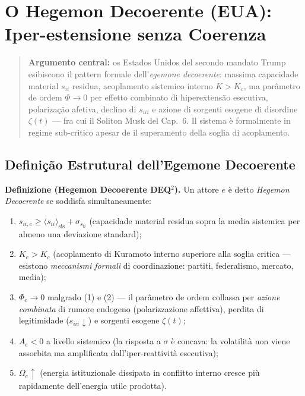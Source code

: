 \chapter{O Hegemon Decoerente (EUA): Iper-estensione senza
Coerenza}\label{legemone-decoerente-usa-hiperextensão-senza-coerenza}

\begin{quote}
\textbf{Argumento central:} os Estados Unidos del secondo mandato Trump
esibiscono il pattern formale dell'\emph{egemone decoerente}: massima
capacidade material \(s_{ii}\) residua, acoplamento sistemico interno
\(K > K_c\), ma parâmetro de ordem \(\Phi \to 0\) per effetto combinato
di hiperextensão esecutiva, polarização afetiva, declino di
\(s_{iii}\) e azione di sorgenti esogene di disordine \(\zeta(t)\) ---
fra cui il Soliton Musk del Cap.~6. Il sistema è formalmente in regime
sub-critico apesar de il superamento della soglia di acoplamento.
\end{quote}



\section{Definição Estrutural dell'Egemone
Decoerente}\label{definição-estrutural-dellegemone-decoerente}

\Hypoth{} \textbf{Definizione (Hegemon Decoerente DEQ$^2$).} Un attore
\(e\) è detto \emph{Hegemon Decoerente} se soddisfa simultaneamente:

\begin{enumerate}
\def\labelenumi{\arabic{enumi}.}
\tightlist
\item
  \(s_{ii,e} \geq \langle s_{ii} \rangle_{\text{sis}} + \sigma_{s_{ii}}\)
  (capacidade material residua sopra la media sistemica per almeno una
  deviazione standard);
\item
  \(K_e > K_c\) (acoplamento di Kuramoto interno superiore alla soglia
  critica --- esistono \emph{meccanismi formali} di coordinazione:
  partiti, federalismo, mercato, media);
\item
  \(\Phi_e \to 0\) malgrado (1) e (2) --- il parâmetro de ordem collassa
  per \emph{azione combinata} di rumore endogeno (polarizzazione
  affettiva), perdita di legitimidade (\(s_{iii} \downarrow\)) e sorgenti
  esogene \(\zeta(t)\);
\item
  \(A_e < 0\) a livello sistemico (la risposta a \(\sigma\) è concava:
  la volatilità non viene assorbita ma amplificata dall'iper-reattività
  esecutiva);
\item
  \(\Omega_e \uparrow\) (energia istituzionale dissipata in conflitto
  interno cresce più rapidamente dell'energia utile prodotta).
\end{enumerate}


